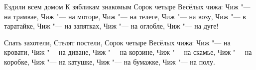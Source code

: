 \noindent\hspace*{5cm}%
\begin{minipage}[t]{\dimexpr\linewidth-5cm}
               Ездили всем домом \newline
               К зябликам знакомым \newline
               Сорок четыре \newline
               Весёлых чижа: \newline
               Чиж "--- на трамвае, \newline
               Чиж "--- на моторе, \newline
               Чиж "--- на телеге, \newline
               Чиж "--- на возу, \newline
               Чиж "--- в таратайке, \newline
               Чиж "--- на запятках, \newline
               Чиж "--- на оглобле, \newline
               Чиж "--- на дуге! \newline
\end{minipage}

\noindent\hspace*{6cm}%
\begin{minipage}[t]{\dimexpr\linewidth-6cm}
            Спать захотели, \newline
            Стелят постели,\newline
            Сорок четыре\newline
            Весёлых чижа:\newline
            Чиж "--- на кровати,\newline
            Чиж "--- на диване,\newline
            Чиж "--- на корзине,\newline
            Чиж "--- на скамье,\newline
            Чиж "--- на коробке,\newline
            Чиж "--- на катушке,\newline
            Чиж "--- на бумажке,\newline
            Чиж "--- на полу.\newline
\end{minipage}
               

